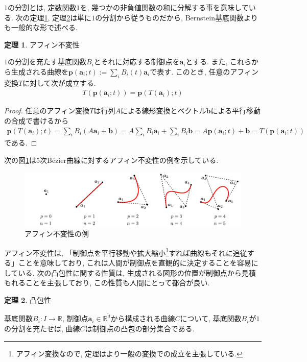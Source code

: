 \documentclass{jsarticle}
\newcommand\setR{\mathbb{R}}
\theoremstyle{definition}%
\newtheorem{thm}{定理}
\begin{document}
\newpage
$1$の分割とは, 定数関数$1$を, 幾つかの非負値関数の和に分解する事を意味している.
次の定理\ref{affine}, 定理\ref{convex}は単に$1$の分割から従うものだから, Bernstein基底関数よりも一般的な形で述べる.
\begin{screen}
	\begin{thm}
		\label{affine}
		アフィン不変性\footnotemark

		$1$の分割を充たす基底関数$B_i$とそれに対応する制御点を$\bm{a}_i$とする.
		また, これらから生成される曲線を$\displaystyle\bm{p}(\bm{a}_i;t):=\sum_i B_i(t)\bm{a}_i$で表す.
		このとき, 任意のアフィン変換$T$に対して次が成立する.
		\begin{align}
			T(\bm{p}(\bm{a}_i;t))=\bm{p}(T(\bm{a}_i);t)
		\end{align}
	\end{thm}
\end{screen}
\begin{proof}
	任意のアフィン変換$T$は行列$A$による線形変換とベクトル$\bm{b}$による平行移動の合成で書けるから
	\begin{align}
		\bm{p}(T(\bm{a}_i);t)
		=\sum_iB_i(A\bm{a}_i+\bm{b})
		=A\sum_iB_i\bm{a}_i+\sum_iB_i\bm{b}
		=A\bm{p}(\bm{a}_i;t)+\bm{b}
		=T(\bm{p}(\bm{a}_i;t))
	\end{align}
	である.
\end{proof}
次の図\ref{Fig130}は$5$次B\'{e}zier曲線に対するアフィン不変性の例を示している.
\begin{figure}[H]
	\centering
    \includegraphics[page=13,clip,width=135mm]{fig.pdf}
	\caption{アフィン不変性の例}
	\label{Fig130}
\end{figure}
アフィン不変性は, 「制御点を平行移動や拡大縮小\footnote{アフィン変換なので, 定理はより一般の変換での成立を主張している.}すれば曲線もそれに追従する」ことを意味しており, これは人間が制御点を直観的に決定することを容易にしている.
次の凸包性に関する性質は, 生成される図形の位置が制御点から見積もれることを主張しており, この性質も人間にとって都合が良い.
\begin{screen}
	\begin{thm}
        \label{convex}
		凸包性

		基底関数$B_i:I\to \setR$, 制御点$\bm{a}_i\in \setR^{\tilde{d}}$から構成される曲線$C$について, 基底関数$B_i$が$1$の分割を充たせば, 曲線$C$は制御点の凸包の部分集合である.
	\end{thm}
\end{screen}
\end{document}
